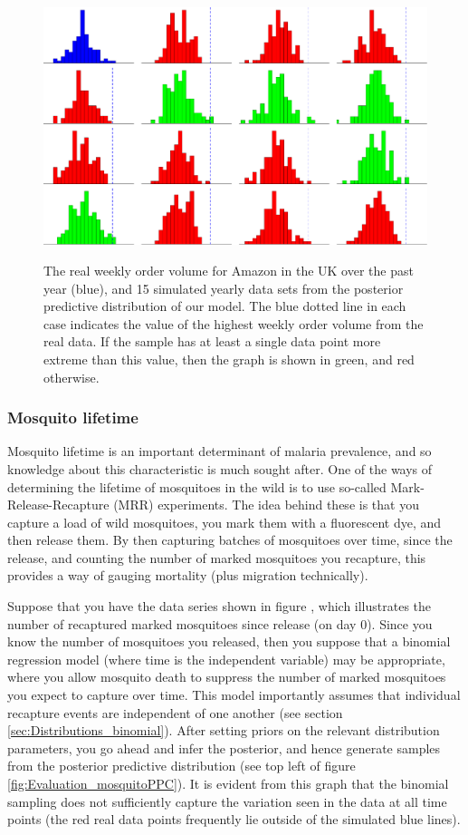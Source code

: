 \documentclass[11pt,fullpage]{book}
\begin{document}
\begin{figure}
\centering
\scalebox{0.5} 
{\includegraphics{Evaluation_amazonExample.pdf}}
\caption{The real weekly order volume for Amazon in the UK over the past year (blue), and 15 simulated yearly data sets from the posterior predictive distribution of our model. The blue dotted line in each case indicates the value of the highest weekly order volume from the real data. If the sample has at least a single data point more extreme than this value, then the graph is shown in green, and red otherwise.}\label{fig:Evaluation_amazonExample}
\end{figure}

\subsubsection{Mosquito lifetime}
Mosquito lifetime is an important determinant of malaria prevalence, and so knowledge about this characteristic is much sought after. One of the ways of determining the lifetime of mosquitoes in the wild is to use so-called Mark-Release-Recapture (MRR) experiments. The idea behind these is that you capture a load of wild mosquitoes, you mark them with a fluorescent dye, and then release them. By then capturing batches of mosquitoes over time, since the release, and counting the number of marked mosquitoes you recapture, this provides a way of gauging mortality (plus migration technically). 

Suppose that you have the data series shown in figure , which illustrates the number of recaptured marked mosquitoes since release (on day 0). Since you know the number of mosquitoes you released, then you suppose that a binomial regression model (where time is the independent variable) may be appropriate, where you allow mosquito death to suppress the number of marked mosquitoes you expect to capture over time. This model importantly assumes that individual recapture events are independent of one another (see section \ref{sec:Distributions_binomial}). After setting priors on the relevant distribution parameters, you go ahead and infer the posterior, and hence generate samples from the posterior predictive distribution (see top left of figure \ref{fig:Evaluation_mosquitoPPC}). It is evident from this graph that the binomial sampling does not sufficiently capture the variation seen in the data at all time points (the red real data points frequently lie outside of the simulated blue lines). 
\end{document}
